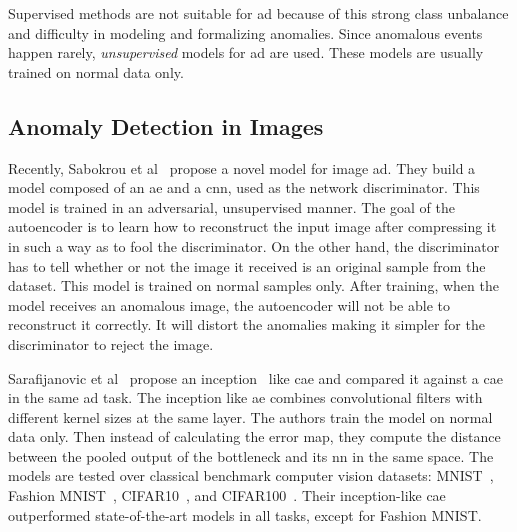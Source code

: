 
Supervised methods are not suitable for \acrshort{ad} because of this strong class unbalance and difficulty in modeling and formalizing anomalies.
Since anomalous events happen rarely, \emph{unsupervised} models for \acrshort{ad} are used. These models are usually trained on normal data only.
\\

\subsection{Anomaly Detection in Images}    
   Recently, Sabokrou et al~\cite{Sabokrou_2018_CVPR} propose a novel model for image \acrshort{ad}.
   They build a model composed of an \acrfull{ae} and a \acrfull{cnn}, used as the network discriminator. This model is trained in an adversarial, unsupervised manner.
   The goal of the autoencoder is to learn how to reconstruct the input image after compressing it in such a way as to fool the discriminator. On the other hand, the discriminator has to tell whether or not the image it received is an original sample from the dataset.
   This model is trained on normal samples only. After training, when the model receives an anomalous image, the autoencoder will not be able to reconstruct it correctly. It will distort the anomalies making it simpler for the discriminator to reject the image. 
   
   
   Sarafijanovic et al~\cite{Sarafijanovic2019distance} propose an inception~\cite{Szegedy_2015_CVPR} like \acrfull{cae} and compared it against a \acrshort{cae} in the same \acrshort{ad} task. The inception like \acrshort{ae} combines convolutional filters with different kernel sizes at the same layer. The authors train the model on normal data only. Then instead of calculating the error map, they compute the distance between the pooled output of the bottleneck and its \acrfull{nn} in the same space. The models are tested over classical benchmark computer vision datasets: MNIST~\cite{lecun1998mnist}, Fashion MNIST~\cite{xiao2017fashion}, CIFAR10~\cite{cifar10}, and CIFAR100~\cite{cifar100}. Their inception-like \acrshort{cae} outperformed state-of-the-art models in all tasks, except for Fashion MNIST.
    
